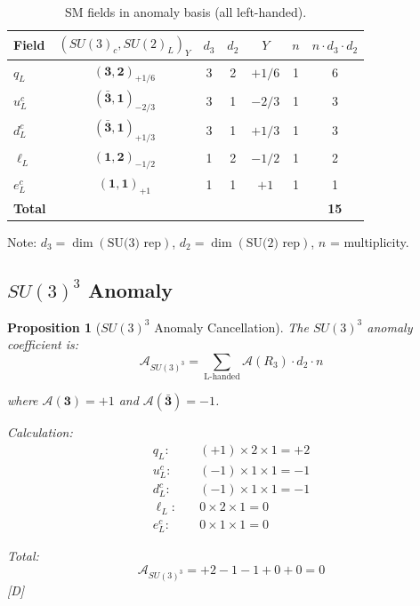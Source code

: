 \documentclass[11pt,a4paper]{article}
\newtheorem{proposition}[theorem]{Proposition}
\newcommand{\tagD}{\textcolor{blue!70!black}{[D]}}
\begin{document}
\begin{table}[h]
\centering
\caption{SM fields in anomaly basis (all left-handed).}
\label{tab:sm-anomaly-basis}
\begin{tabular}{lcccccc}
\toprule
Field & $(SU(3)_c, SU(2)_L)_Y$ & $d_3$ & $d_2$ & $Y$ & $n$ & $n \cdot d_3 \cdot d_2$ \\
\midrule
$q_L$ & $(\mathbf{3}, \mathbf{2})_{+1/6}$ & 3 & 2 & $+1/6$ & 1 & 6 \\
$u_L^c$ & $(\bar{\mathbf{3}}, \mathbf{1})_{-2/3}$ & 3 & 1 & $-2/3$ & 1 & 3 \\
$d_L^c$ & $(\bar{\mathbf{3}}, \mathbf{1})_{+1/3}$ & 3 & 1 & $+1/3$ & 1 & 3 \\
$\ell_L$ & $(\mathbf{1}, \mathbf{2})_{-1/2}$ & 1 & 2 & $-1/2$ & 1 & 2 \\
$e_L^c$ & $(\mathbf{1}, \mathbf{1})_{+1}$ & 1 & 1 & $+1$ & 1 & 1 \\
\midrule
\textbf{Total} & & & & & & \textbf{15} \\
\bottomrule
\end{tabular}
\end{table}

Note: $d_3 = \dim(\text{SU(3) rep})$, $d_2 = \dim(\text{SU(2) rep})$, $n$ = multiplicity.

\subsection{$SU(3)^3$ Anomaly}

\begin{proposition}[$SU(3)^3$ Anomaly Cancellation]
\label{prop:su3-anomaly}
The $SU(3)^3$ anomaly coefficient is:
\begin{equation}
\label{eq:su3-anomaly-def}
\mathcal{A}_{SU(3)^3} = \sum_{\text{L-handed}} \mathcal{A}(R_3) \cdot d_2 \cdot n
\end{equation}

where $\mathcal{A}(\mathbf{3}) = +1$ and $\mathcal{A}(\bar{\mathbf{3}}) = -1$.

Calculation:
\begin{align}
\label{eq:su3-qL}
q_L: \quad & (+1) \times 2 \times 1 = +2 \\
\label{eq:su3-uLc}
u_L^c: \quad & (-1) \times 1 \times 1 = -1 \\
\label{eq:su3-dLc}
d_L^c: \quad & (-1) \times 1 \times 1 = -1 \\
\label{eq:su3-lL}
\ell_L: \quad & 0 \times 2 \times 1 = 0 \\
\label{eq:su3-eLc}
e_L^c: \quad & 0 \times 1 \times 1 = 0
\end{align}

Total:
\begin{equation}
\label{eq:su3-total}
\boxed{\mathcal{A}_{SU(3)^3} = +2 - 1 - 1 + 0 + 0 = 0}
\end{equation}
\tagD
\end{proposition}
\end{document}
